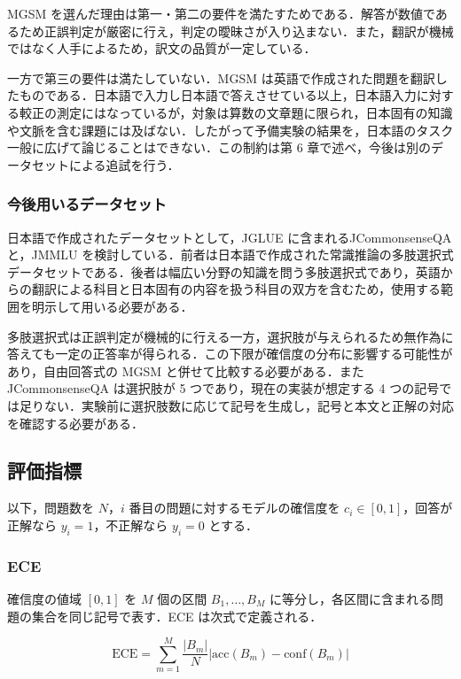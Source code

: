 MGSM を選んだ理由は第一・第二の要件を満たすためである．解答が数値であるため正誤判定が厳密に行え，判定の曖昧さが入り込まない．また，翻訳が機械ではなく人手によるため，訳文の品質が一定している．

一方で第三の要件は満たしていない．MGSM は英語で作成された問題を翻訳したものである．日本語で入力し日本語で答えさせている以上，日本語入力に対する較正の測定にはなっているが，対象は算数の文章題に限られ，日本固有の知識や文脈を含む課題には及ばない．したがって予備実験の結果を，日本語のタスク一般に広げて論じることはできない．この制約は第 6 章で述べ，今後は別のデータセットによる追試を行う．

\subsubsection{今後用いるデータセット}

日本語で作成されたデータセットとして，JGLUE \cite{kurihara2022jglue} に含まれるJCommonsenseQA と，JMMLU を検討している．前者は日本語で作成された常識推論の多肢選択式データセットである．後者は幅広い分野の知識を問う多肢選択式であり，英語からの翻訳による科目と日本固有の内容を扱う科目の双方を含むため，使用する範囲を明示して用いる必要がある．

多肢選択式は正誤判定が機械的に行える一方，選択肢が与えられるため無作為に答えても一定の正答率が得られる．この下限が確信度の分布に影響する可能性があり，自由回答式の MGSM と併せて比較する必要がある．また JCommonsenseQA は選択肢が 5 つであり，現在の実装が想定する 4 つの記号では足りない．実験前に選択肢数に応じて記号を生成し，記号と本文と正解の対応を確認する必要がある．

\subsection{評価指標}

以下，問題数を $N$，$i$ 番目の問題に対するモデルの確信度を $c_i \in [0,1]$，回答が正解なら $y_i = 1$，不正解なら $y_i = 0$ とする．

\subsubsection{ECE}

確信度の値域 $[0,1]$ を $M$ 個の区間 $B_1, \dots, B_M$ に等分し，各区間に含まれる問題の集合を同じ記号で表す．ECE は次式で定義される．

\begin{equation}
\mathrm{ECE} = \sum_{m=1}^{M} \frac{|B_m|}{N} \bigl| \mathrm{acc}(B_m) - \mathrm{conf}(B_m) \bigr|
\end{equation}

